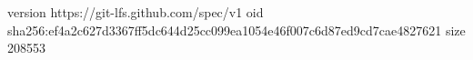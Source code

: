 version https://git-lfs.github.com/spec/v1
oid sha256:ef4a2c627d3367ff5dc644d25cc099ea1054e46f007c6d87ed9cd7cae4827621
size 208553
